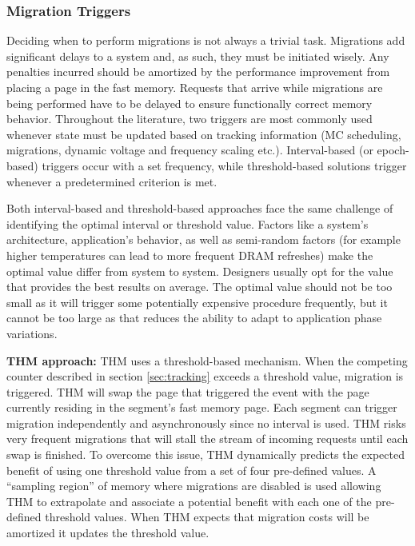 \subsubsection{Migration Triggers}

Deciding when to perform migrations is not always a trivial task. Migrations add significant delays to a system and, as such, they must be initiated wisely. Any penalties incurred should be amortized by the performance improvement from placing a page in the fast memory. Requests that arrive while migrations are being performed have to be delayed to ensure functionally correct memory behavior. Throughout the literature, two triggers are most commonly used whenever state must be updated based on tracking information (MC scheduling, migrations, dynamic voltage and frequency scaling etc.). Interval-based (or epoch-based) triggers occur with a set frequency, while threshold-based solutions trigger whenever a predetermined criterion is met. 

Both interval-based and threshold-based approaches face the same challenge of identifying the optimal interval or threshold value. Factors like a system's architecture, application's behavior, as well as semi-random factors (for example higher temperatures can lead to more frequent DRAM refreshes) make the optimal value differ from system to system. Designers usually opt for the value that provides the best results on average. The optimal value should not be too small as it will trigger some potentially expensive procedure frequently, but it cannot be too large as that reduces the ability to adapt to application phase variations. 


	\textbf{THM approach:} THM uses a threshold-based mechanism. When the competing counter described in section \ref{sec:tracking} exceeds a threshold value, migration is triggered. THM will swap the page that triggered the event with the page currently residing in the segment's fast memory page. Each segment can trigger migration independently and asynchronously since no interval is used. THM risks very frequent migrations that will stall the stream of incoming requests until each swap is finished. To overcome this issue, THM dynamically predicts the expected benefit of using one threshold value from a set of four pre-defined values. A ``sampling region'' of memory where migrations are disabled is used allowing THM to extrapolate and associate a potential benefit with each one of the pre-defined threshold values. When THM expects that migration costs will be amortized it updates the threshold value.
	
